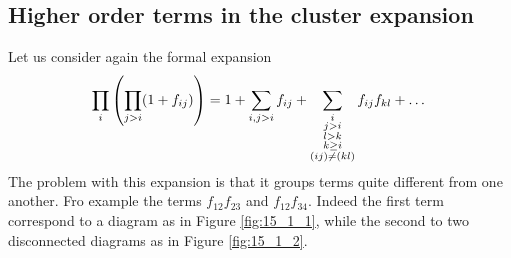 \documentclass[../main/main.tex]{subfiles}
\begin{document}
\subsection{Higher order terms in the cluster expansion}
Let us consider again the formal expansion
\begin{equation}
  \prod_{i}^{} \qty(\prod_{j>i}^{} (1+f_{ij}) ) = 1 + \sum_{i,j>i}^{} f_{ij}
  + \sum_{\substack{ i \\ j>i \\ l>k \\ k \ge i \\ (ij) \neq (kl)} }^{} f_{ij} f_{kl}     + \dots
\end{equation}
The problem with this expansion is that it groups terms quite different from one another. Fro example the terms \( f_{12}f_{23} \) and \( f_{12}f_{34} \). Indeed the first term correspond to a diagram as in Figure \ref{fig:15_1_1}, while the second to two disconnected diagrams as in Figure \ref{fig:15_1_2}.
\begin{figure}[h!]
\begin{minipage}[c]{0.5\linewidth}
\end{minipage}
\begin{minipage}[]{0.5\linewidth}
\centering
{}
\end{minipage}
\caption{\label{fig:} }
\end{figure}
\end{document}
